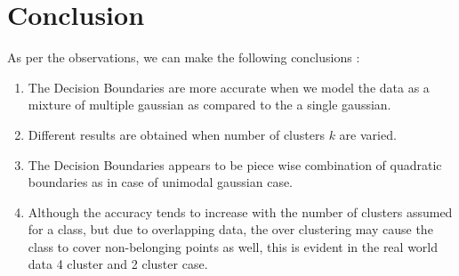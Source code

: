\documentclass[a4paper]{article}
\begin{document}
\section{Conclusion}
	As per the observations, we can make the following conclusions :
	
	\begin{enumerate}
	  \item The Decision Boundaries are more accurate when we model the data as a mixture of multiple gaussian as compared to the a single gaussian.
	  \item Different results are obtained when number of clusters $k$ are varied.   	
	  \item The Decision Boundaries appears to be piece wise combination of quadratic boundaries as in case of unimodal gaussian case.
      \item Although the accuracy tends to increase with the number of clusters assumed for a class, but due to overlapping data, the over clustering may cause the class to cover non-belonging points as well, this is evident in the real world data 4 cluster and 2 cluster case.  
	\end{enumerate}
\end{document}
